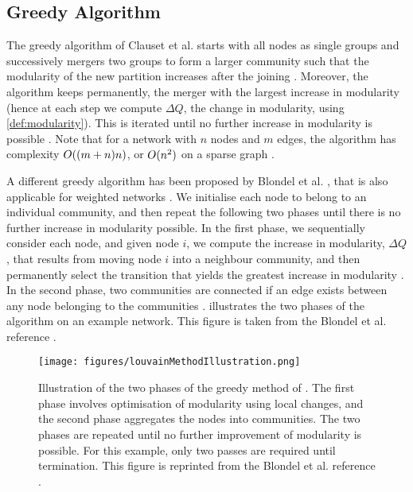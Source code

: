 
\subsection{Greedy Algorithm}
\label{subsec:greedyAlgorithm}

The greedy algorithm of Clauset et al. \cite{CNM04} starts with all nodes as single groups and successively mergers two groups to form a larger community such that the modularity of the new partition increases after the joining \cite{CNM04,For10}.
Moreover, the algorithm keeps permanently, the merger with the largest increase in modularity (hence at each step we compute $\Delta Q$, the change in modularity, using \cref{def:modularity}).
This is iterated until no further increase in modularity is possible \cite{CNM04}.
Note that for a network with $n$ nodes and $m$ edges, the algorithm has complexity $O((m+n)n)$, or $O(n^{2})$ on a sparse graph \cite{For10}.

A different greedy algorithm has been proposed by Blondel et al. \cite{BGL+08}, that is also applicable for weighted networks \cite{For10}.
We initialise each node to belong to an individual community, and then repeat the following two phases until there is no further increase in modularity possible.
In the first phase, we sequentially consider each node, and given node $i$, we compute the increase in modularity, $\Delta Q$, that results from moving node $i$ into a neighbour community, and then permanently select the transition that yields the greatest increase in modularity \cite{BGL+08,For10}.
In the second phase, two communities are connected if an edge exists between any node belonging to the communities \cite{BGL+08,For10}.
 illustrates the two phases of the algorithm on an example network. This figure is taken from the Blondel et al. reference \cite{BGL+08}.

\begin{figure}
	\centering
	\texttt{[image: figures/louvainMethodIllustration.png]}
	\caption[Illustration of greedy algorithm for modularity optimisation]{\label{fig:LouvainMethodIllustration} Illustration of the two phases of the greedy method of \cite{BGL+08}. The first phase involves optimisation of modularity using local changes, and the second phase aggregates the nodes into communities. The two phases are repeated until no further improvement of modularity is possible. For this example, only two passes are required until termination. This figure is reprinted from the Blondel et al. reference \cite{BGL+08}.}
\end{figure}

